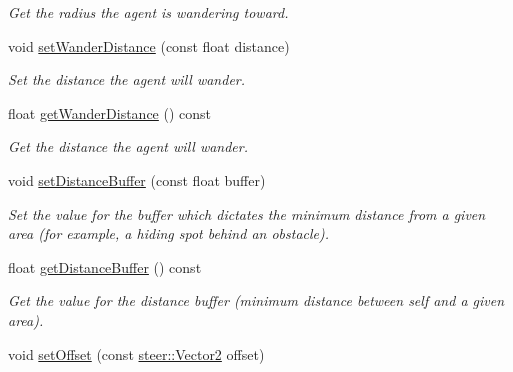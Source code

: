 \begin{DoxyCompactItemize}
\begin{DoxyCompactList}\small\item\em Get the radius the agent is wandering toward. \end{DoxyCompactList}\item 
void \hyperlink{classsteer_1_1_agent_aff41b2f86f61a554d3e2788baff6493b}{set\-Wander\-Distance} (const float distance)
\begin{DoxyCompactList}\small\item\em Set the distance the agent will wander. \end{DoxyCompactList}\item 
\hypertarget{classsteer_1_1_agent_a884eebde33e5cf3919aed101352c0d00}{float \hyperlink{classsteer_1_1_agent_a884eebde33e5cf3919aed101352c0d00}{get\-Wander\-Distance} () const }\label{classsteer_1_1_agent_a884eebde33e5cf3919aed101352c0d00}

\begin{DoxyCompactList}\small\item\em Get the distance the agent will wander. \end{DoxyCompactList}\item 
void \hyperlink{classsteer_1_1_agent_abdadb99a029745ca22ffa5a6d615f295}{set\-Distance\-Buffer} (const float buffer)
\begin{DoxyCompactList}\small\item\em Set the value for the buffer which dictates the minimum distance from a given area (for example, a hiding spot behind an obstacle). \end{DoxyCompactList}\item 
\hypertarget{classsteer_1_1_agent_ab356d904b06ee8a654b8cf0e9512439f}{float \hyperlink{classsteer_1_1_agent_ab356d904b06ee8a654b8cf0e9512439f}{get\-Distance\-Buffer} () const }\label{classsteer_1_1_agent_ab356d904b06ee8a654b8cf0e9512439f}

\begin{DoxyCompactList}\small\item\em Get the value for the distance buffer (minimum distance between self and a given area). \end{DoxyCompactList}\item 
\hypertarget{classsteer_1_1_agent_a1df4096608824947013a135b8215ac26}{void \hyperlink{classsteer_1_1_agent_a1df4096608824947013a135b8215ac26}{set\-Offset} (const \hyperlink{structsteer_1_1_vector2}{steer\-::\-Vector2} offset)}\label{classsteer_1_1_agent_a1df4096608824947013a135b8215ac26}


\end{DoxyCompactItemize}
